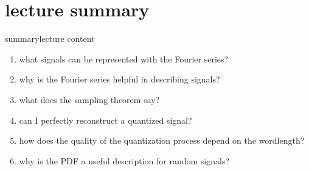     \section[summary]{lecture summary}
        \begin{frame}{summary}{lecture content}
            \begin{enumerate}
                \item       what signals can be represented with the Fourier series?
                \bigskip
                \item<2->   why is the Fourier series helpful in describing signals?
                \bigskip
                \item<3->   what does the sampling theorem say?
                \bigskip
                \item<4->   can I perfectly reconstruct a quantized signal?
                \bigskip
                \item<5->   how does the quality of the quantization process depend on the wordlength?
                \bigskip
                \item<6->   why is the PDF a useful description for random signals?
            \end{enumerate}
        \end{frame}



